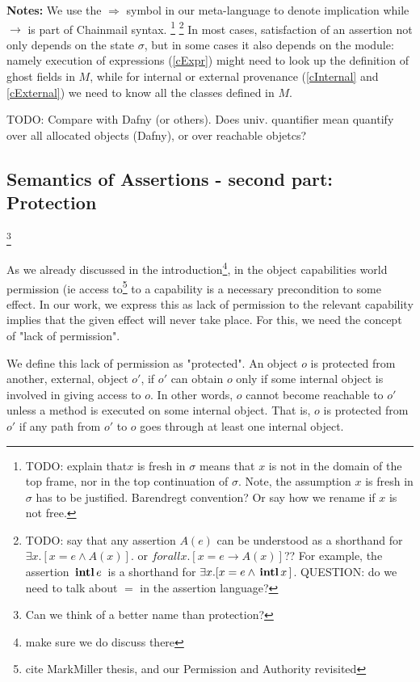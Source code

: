 \textbf{Notes:}  We use the $\Longrightarrow$ symbol in our meta-language to denote implication while $\rightarrow$ is part of Chainmail syntax.
\footnote{{TODO: explain that$x$ is fresh in $\sigma$  means that $x$ is not in the domain of the top frame, nor in the top continuation of $\sigma$.
 Note, the assumption $x$ is fresh in $\sigma$ has to be justified. Barendregt convention? Or say how we rename if $x$ is not free.}}
\footnote{{TODO: say that any assertion $A(e)$ can be understood as a shorthand for $\exists x. [ x=e \wedge A(x)]$. or  $forall x. [ x=e \rightarrow A(x)]$?? For example, the  assertion   ${{\, \mathbf{intl}\, e\, }}$ is a shorthand for $\exists x. [ x=e \wedge {{\ensuremath{\, \mathbf{intl}}\, x\, }}]$. QUESTION: do we need to talk about $=$ in the assertion language?}}
In most cases, satisfaction of an assertion not only depends on the state $\sigma$, but 
in some cases it also depends on the module: namely execution of expressions (\ref{cExpr}) might need to look up the definition of ghost fields  in $M$, while 
for internal or external provenance (\ref{cInternal} and \ref{cExternal}) we need to know all the classes defined in $M$.

TODO: Compare with Dafny (or others). Does univ. quantifier mean quantify over all allocated objects (Dafny), or over reachable objetcs?

\subsection{Semantics of Assertions - second part: Protection}\footnote{Can we think of a better name than protection?}

As we already discussed in the introduction\footnote{make sure we do discuss there}, in the object capabilities world permission (ie access to\footnote{cite MarkMiller thesis, and our Permission and Authority revisited} to a capability is a necessary precondition to some effect. In our work, we express this as lack of permission to the relevant capability implies that the given effect will never take place.
For this, we need the concept of "lack of permission".  

We define this lack of permission as "protected".  An object $o$ is protected from another, external, object $o'$, if $o'$ can obtain   $o$ only if 
some internal object is involved in giving access to $o$. In other words, $o$ cannot become reachable to $o'$ unless a method is executed on
some internal object. That is, $o$ is protected from $o'$ if any path from $o'$ to $o$ goes through at least one internal object.

